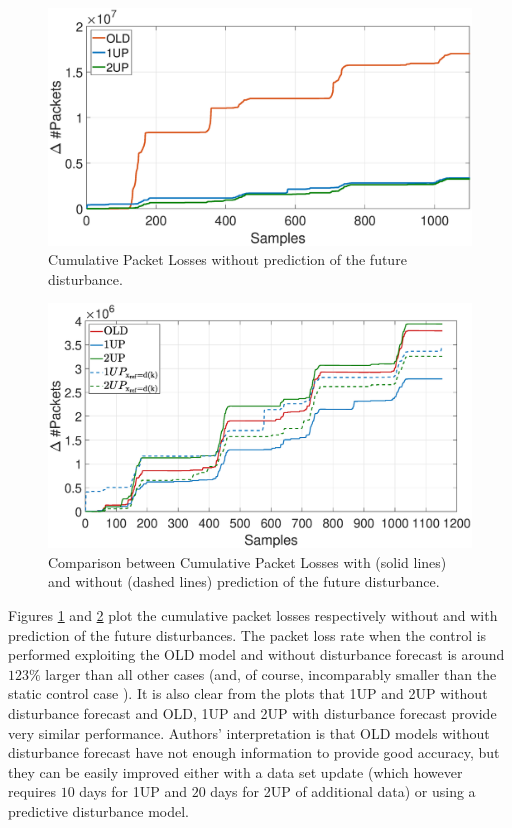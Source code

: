  \begin{figure}[h!]
	\centering
	\includegraphics[trim={120 0 120 0}, width=0.9\linewidth]{figure/cumPL1.eps}
	\caption{Cumulative Packet Losses without prediction of the future disturbance.}
	\label{fig:{MPC1}}
\end{figure}
\begin{figure}[h!]
	\centering
	\includegraphics[trim={120 0 120 0},width=0.85\linewidth]{figure/cumPL_Total.eps}
	\caption{Comparison between Cumulative Packet Losses with (solid lines)  and without (dashed lines) prediction of the future disturbance.}
	\label{fig:{MPC2}}
\end{figure}
 Figures \ref{fig:{MPC1}} and \ref{fig:{MPC2}} plot the cumulative packet losses respectively without and with prediction of the future disturbances. The packet loss rate when the control is performed exploiting the OLD model and without disturbance forecast is around $123\%$ larger than all other cases (and, of course, incomparably smaller than the static control case \cite{Notiziario}). It is also clear from the plots that 1UP and 2UP without disturbance forecast and OLD, 1UP and 2UP with disturbance forecast provide very similar performance. Authors' interpretation is that OLD models without disturbance forecast have not enough information to provide good accuracy, but they can be easily improved either with a data set update (which however requires $10$ days for 1UP and $20$ days for 2UP of additional data) or using a predictive disturbance model.

